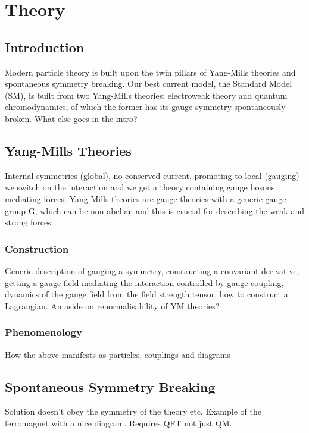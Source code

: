 \chapter{Theory}
\label{chap:theory}

\section{Introduction}
Modern particle theory is built upon the twin pillars of Yang-Mills theories and spontaneous symmetry breaking. 
Our best current model, the Standard Model (SM), is built from two Yang-Mills theories: electroweak theory and quantum chromodynamics, of which the former has its gauge symmetry spontaneously broken. What else goes in the intro?

\section{Yang-Mills Theories}
Internal symmetries (global), no conserved current, promoting to local (gauging) we switch on the interaction and we get a theory containing gauge bosons mediating forces. Yang-Mills theories are gauge theories with a generic gauge group G, which can be non-abelian and this is crucial for describing the weak and strong forces.

\subsection{Construction}
Generic description of gauging a symmetry, constructing a convariant derivative, getting a gauge field mediating the interaction controlled by gauge coupling, dynamics of the gauge field from the field strength tensor, how to construct a Lagrangian. An aside on renormalisability of YM theories?

\subsection{Phenomenology}
How the above manifests as particles, couplings and diagrams 



\section{Spontaneous Symmetry Breaking}

Solution doesn't obey the symmetry of the theory etc. Example of the ferromagnet with a nice diagram. Requires QFT not just QM. 

